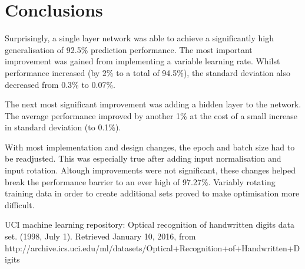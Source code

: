 \documentclass[11]{article}
\begin{document}
\section{Conclusions}
Surprisingly, a single layer network was able to achieve a significantly high generalisation of 92.5\% prediction performance. The most important improvement was  gained from implementing a variable learning rate. Whilst performance increased (by 2\% to a total of 94.5\%), the standard deviation also decreased from 0.3\% to 0.07\%.

The next most significant improvement was adding a hidden layer to the network. The average performance improved by another 1\% at the cost of a small increase in standard deviation (to 0.1\%).

With most implementation and design changes, the epoch and batch size had to be readjusted. This was especially true after adding input normalisation and input rotation. Altough improvements were not significant, these changes helped break the performance barrier to an ever high of 97.27\%. Variably rotating training data in order to create additional sets proved to make optimisation more difficult. 

\begin{thebibliography}{9}
UCI machine learning repository: Optical recognition of handwritten digits data set. (1998, July 1). Retrieved January 10, 2016, from http://archive.ics.uci.edu/ml/datasets/Optical+Recognition+of+Handwritten+Digits

\end{thebibliography}
\end{document}
